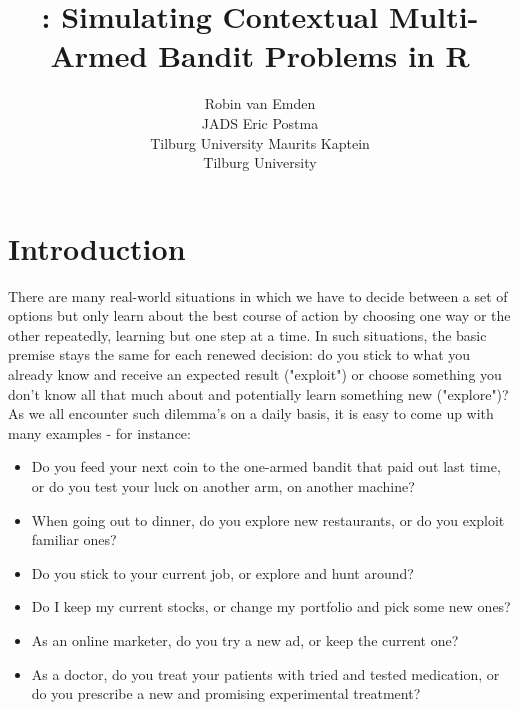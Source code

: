 \documentclass[nojss]{jss}\usepackage[]{graphicx}\usepackage[]{color}
\author{Robin van Emden\\JADS \And
  Eric Postma\\Tilburg University \And
  Maurits Kaptein\\Tilburg University}
\title{\pkg{contextual}: Simulating Contextual Multi-Armed Bandit Problems in R}
\begin{document}






\section{Introduction}

There are many real-world situations in which we have to decide between a set of options but only learn about the best course of action by choosing one way or the other repeatedly, learning but one step at a time. In such situations, the basic premise stays the same for each renewed decision: do you stick to what you already know and receive an expected result ("exploit") or choose something you don't know all that much about and potentially learn something new ("explore")? As we all encounter such dilemma's on a daily basis, it is easy to come up with many examples - for instance:

\begin{itemize}
\item Do you feed your next coin to the one-armed bandit that paid out last time, or do you test your luck on another arm, on another machine?
\item When going out to dinner, do you explore new restaurants, or do you exploit familiar ones?
\item Do you stick to your current job, or explore and hunt around?
\item Do I keep my current stocks, or change my portfolio and pick some new ones?
\item As an online marketer, do you try a new ad, or keep the current one?
\item As a doctor, do you treat your patients with tried and tested medication, or do you prescribe a new and promising experimental treatment?
\end{itemize}
\end{document}
